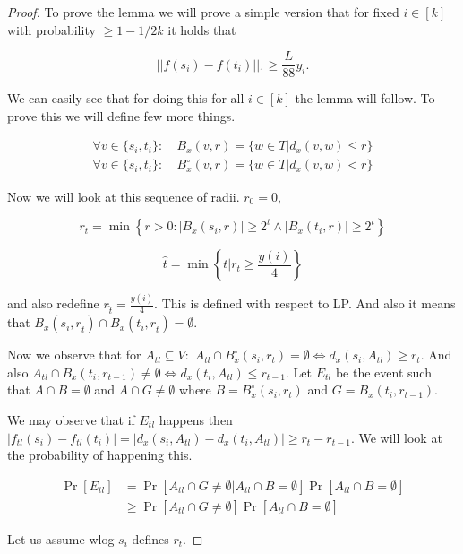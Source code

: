 \begin{proof}
	To prove the lemma we will prove a simple version that for fixed $i \in [k]$ with probability $\geq 1 - 1/2k$ it holds that
	
	$$
	||f(s_{i}) - f(t_{i})||_{1} \geq \frac{L}{88} y_{i}.
	$$
	
	We can easily see that for doing this for all $i \in [k]$ the lemma will follow. To prove this we will define few more things.
	
	$$
	\begin{aligned}
		\forall v \in \{s_{i}, t_{i}\}: &\ B_{x}(v, r) = \{w \in T | d_{x}(v,w) \leq r\}\\
		\forall v \in \{s_{i}, t_{i}\}: &\ B_{x}^{\circ}(v, r) = \{w \in T | d_{x}(v,w) < r\}
	\end{aligned}
	$$
	
	Now we will look at this sequence of radii. $r_{0} = 0$,
	
	$$
	r_{t} = \min \left\{r > 0 : |B_{x}(s_{i},r)| \geq 2^{t} \land |B_{x}(t_{i},r)| \geq 2^{t}\right\}
	$$
	
	$$
	\hat{t} = \min \left\{t | r_{t} \geq \frac{y(i)}{4}\right\}
	$$
	
	and also redefine $r_{\hat{t}} = \frac{y(i)}{4}$. This is defined with respect to LP. And also it means that $B_{x}(s_{i}, r_{\hat{t}}) \cap B_{x}(t_{i}, r_{\hat{t}}) = \emptyset$.
	
	Now we observe that for $A_{tl} \subseteq V:$ $A_{tl} \cap B_{x}^{\circ}(s_{i}, r_{t}) = \emptyset \Leftrightarrow d_{x}(s_{i}, A_{tl}) \geq r_{t}$. And also $A_{tl} \cap B_{x}(t_{i}, r_{t - 1}) \neq \emptyset \Leftrightarrow d_{x}(t_{i}, A_{tl}) \leq r_{t - 1}$. Let $E_{tl}$ be the event such that $A \cap B = \emptyset$ and $A \cap G \neq \emptyset$ where $B = B_{x}^{\circ}(s_{i}, r_{t})$ and $G = B_{x}(t_{i}, r_{t - 1})$.
	
	We may observe that if $E_{tl}$ happens then $|f_{tl}(s_{i}) - f_{tl}(t_{i})| = |d_{x}(s_{i}, A_{tl}) - d_{x}(t_{i}, A_{tl})| \geq r_{t} - r_{t -1}$. We will look at the  probability of happening this.
	
	$$
	\begin{aligned}
		\Pr[E_{tl}] & = \Pr[A_{tl} \cap G \neq \emptyset | A_{tl} \cap B = \emptyset] \Pr[A_{tl} \cap B = \emptyset] \\
		            & \geq \Pr[A_{tl} \cap G \neq \emptyset] \Pr[A_{tl} \cap B = \emptyset]
	\end{aligned}
	$$
	
	Let us assume wlog $s_{i}$ defines $r_{t}$.
	

\end{proof}
